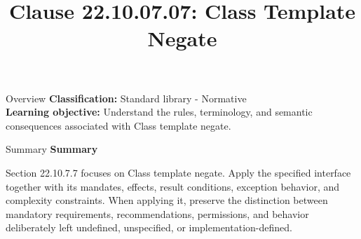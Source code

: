 \documentclass[10pt,letterpaper]{article}
\title{Clause 22.10.07.07: Class Template Negate}
\author{}
\date{}
\begin{document}
\maketitle
\begin{CornellOverviewBox}{Overview}
\textbf{Classification:} Standard library - Normative\\[2pt]
\textbf{Learning objective:} Understand the rules, terminology, and semantic consequences associated with Class template negate.
\end{CornellOverviewBox}\begin{CornellSummaryBox}{Summary}
{\sffamily\bfseries\color{Accent} Summary}\par\vspace{3pt}Section 22.10.7.7 focuses on Class template negate. Apply the specified interface together with its mandates, effects, result conditions, exception behavior, and complexity constraints. When applying it, preserve the distinction between mandatory requirements, recommendations, permissions, and behavior deliberately left undefined, unspecified, or implementation-defined.
\end{CornellSummaryBox}
\end{document}
